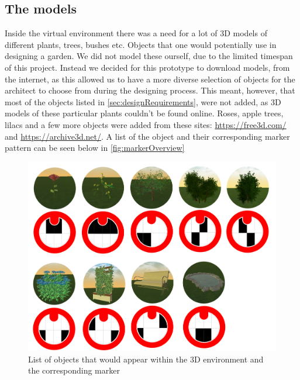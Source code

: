 \subsection{The models}
Inside the virtual environment there was a need for a lot of 3D models of different plants, trees, bushes etc. Objects that one would potentially use in designing a garden. We did not model these ourself, due to the limited timespan of this project. Instead we decided for this prototype to download models, from the internet, as this allowed us to have a more diverse selection of objects for the architect to choose from during the designing process. This meant, however, that most of the objects listed in \autoref{sec:designRequirements}, were not added, as 3D models of these particular plants couldn't be found online. Roses, apple trees, lilacs and a few more objects were added from these sites: \url{https://free3d.com/} and \url{https://archive3d.net/}. A list of the object and their corresponding marker pattern can be seen below in \autoref{fig:markerOverview}

\begin{figure}[H]
	\centering
	\includegraphics[width=0.9\linewidth]{figure/Appendices/markersOverview.png}
	\caption{List of objects that would appear within the 3D environment and the corresponding marker}
	\label{fig:markerOverview}
\end{figure}








